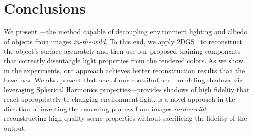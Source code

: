 \section{Conclusions}
  \label{sec:lumigauss-conclusions}

  We present \lumigauss---the method capable of decoupling environment lighting
  and albedo of objects from images \textit{in-the-wild}.
  To this end, we apply 2DGS~\cite{huang20242d} to reconstruct the object's
  surface accurately and then use our proposed training components that
  correctly disentangle light properties from the rendered colors.
  As we show in the experiments, our approach achieves better reconstruction
  results than the baselines.
  We also present that one of our contributions---modeling shadows via
  leveraging Spherical Harmonics properties---provides shadows of high fidelity
  that react appropriately to changing environment light.
  \lumigauss is a novel approach in the direction of inverting the rendering process from images \textit{in-the-wild}, reconstructing high-quality scene properties without sacrificing the fidelity of the output.

